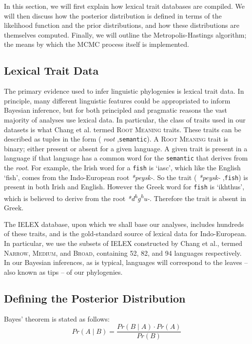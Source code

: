 \documentclass[10pt,journal,compsoc]{IEEEtran}
\newcommand{\ts}{\textsuperscript}
\begin{document}
In this section, we will first explain how lexical trait databases are compiled. We will then discuss how the posterior distribution is defined in terms of the likelihood function and the prior distributions, and how these distributions are themselves computed. Finally, we will outline the Metropolis-Hastings algorithm; the means by which the MCMC process itself is implemented.

\subsection{Lexical Trait Data}

The primary evidence used to infer linguistic phylogenies is lexical trait data. In principle, many different linguistic features could be appropriated to inform Bayesian inference, but for both principled and pragmatic reasons the vast majority of analyses use lexical data. In particular, the class of traits used in our datasets is what Chang et al. termed \textsc{Root Meaning} traits. These traits can be described as tuples in the form (\textit{ root },\;\texttt{semantic}\;). A \textsc{Root Meaning} trait is binary; either present or absent for a given language. A given trait is present in a language if that language has a common word for the \texttt{semantic} that derives from the \textit{root}. For example, the Irish word for a \texttt{fish} is `iasc', which like the English `fish', comes from the Indo-European root \textit{*peysk-}. So the trait (\textit{ *peysk- },\;\texttt{fish}\;) is present in both Irish and English. However the Greek word for \texttt{fish} is `ikhthus', which is believed to derive from the root \textit{*d\ts{h}g\ts{h}u-}. Therefore the trait is absent in Greek.

The IELEX database, upon which we shall base our analyses, includes hundreds of these traits, and is the gold-standard source of lexical data for Indo-European. In particular, we use the subsets of IELEX constructed by Chang et al., termed \textsc{Narrow}, \textsc{Medium}, and \textsc{Broad}, containing 52, 82, and 94 languages respectively. In our Bayesian inferences, as is typical, languages will correspond to the leaves -- also known as tips -- of our phylogenies.

\subsection{Defining the Posterior Distribution}

Bayes' theorem is stated as follows:
\begin{equation}
    Pr(A\;|\;B) = \frac{Pr(B\;|\;A) \cdot Pr(A)}{Pr(B)}
\end{equation}
\end{document}
